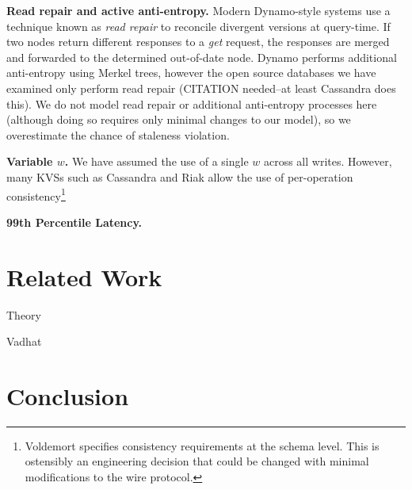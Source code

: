 \documentclass{vldb}
\begin{document}
\textbf{Read repair and active anti-entropy.} Modern Dynamo-style
systems use a technique known as \textit{read repair} to reconcile
divergent versions at query-time.  If two nodes return different
responses to a \textit{get} request, the responses are merged and
forwarded to the determined out-of-date node.  Dynamo performs
additional anti-entropy using Merkel trees, however the open source
databases we have examined only perform read repair (CITATION
needed--at least Cassandra does this). We do not model read repair or
additional anti-entropy processes here (although doing so requires
only minimal changes to our model), so we overestimate the chance of
staleness violation.

\textbf{Variable $w$.} We have assumed the use of a single $w$ across
all writes.  However, many KVSs such as Cassandra and Riak allow the
use of per-operation consistency\footnote{Voldemort specifies
  consistency requirements at the schema level. This is ostensibly an
  engineering decision that could be changed with minimal
  modifications to the wire protocol.}

\textbf{99th Percentile Latency.}


\section{Related Work}
\label{sec:relatedwork}

Theory

Vadhat

\section{Conclusion}
\label{sec:conclusion}

\end{document}
